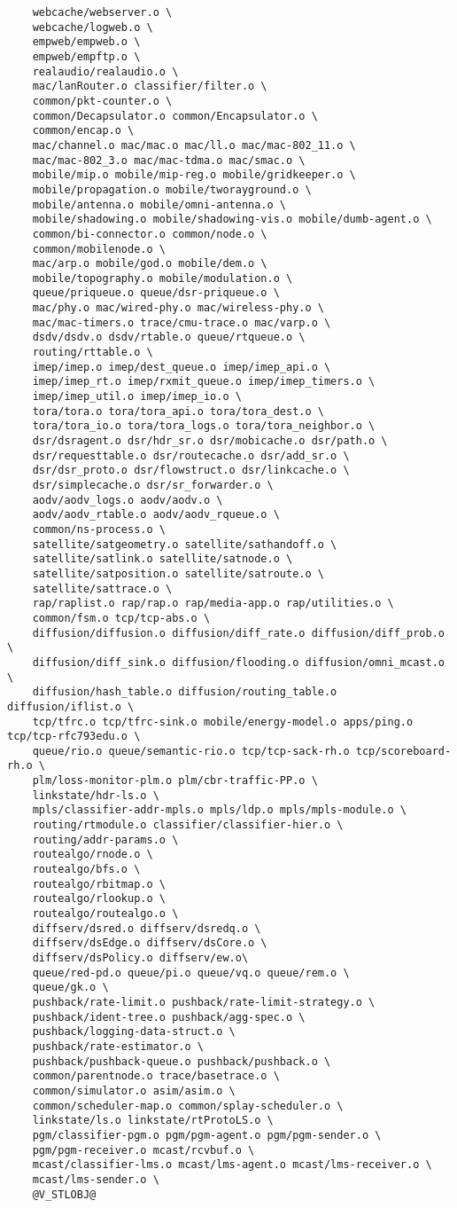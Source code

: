 \begin{verbatim}
	webcache/webserver.o \
	webcache/logweb.o \
	empweb/empweb.o \
	empweb/empftp.o \
	realaudio/realaudio.o \
	mac/lanRouter.o classifier/filter.o \
	common/pkt-counter.o \
	common/Decapsulator.o common/Encapsulator.o \
	common/encap.o \
	mac/channel.o mac/mac.o mac/ll.o mac/mac-802_11.o \
	mac/mac-802_3.o mac/mac-tdma.o mac/smac.o \
	mobile/mip.o mobile/mip-reg.o mobile/gridkeeper.o \
	mobile/propagation.o mobile/tworayground.o \
	mobile/antenna.o mobile/omni-antenna.o \
	mobile/shadowing.o mobile/shadowing-vis.o mobile/dumb-agent.o \
	common/bi-connector.o common/node.o \
	common/mobilenode.o \
	mac/arp.o mobile/god.o mobile/dem.o \
	mobile/topography.o mobile/modulation.o \
	queue/priqueue.o queue/dsr-priqueue.o \
	mac/phy.o mac/wired-phy.o mac/wireless-phy.o \
	mac/mac-timers.o trace/cmu-trace.o mac/varp.o \
	dsdv/dsdv.o dsdv/rtable.o queue/rtqueue.o \
	routing/rttable.o \
	imep/imep.o imep/dest_queue.o imep/imep_api.o \
	imep/imep_rt.o imep/rxmit_queue.o imep/imep_timers.o \
	imep/imep_util.o imep/imep_io.o \
	tora/tora.o tora/tora_api.o tora/tora_dest.o \
	tora/tora_io.o tora/tora_logs.o tora/tora_neighbor.o \
	dsr/dsragent.o dsr/hdr_sr.o dsr/mobicache.o dsr/path.o \
	dsr/requesttable.o dsr/routecache.o dsr/add_sr.o \
	dsr/dsr_proto.o dsr/flowstruct.o dsr/linkcache.o \
	dsr/simplecache.o dsr/sr_forwarder.o \
	aodv/aodv_logs.o aodv/aodv.o \
	aodv/aodv_rtable.o aodv/aodv_rqueue.o \
	common/ns-process.o \
	satellite/satgeometry.o satellite/sathandoff.o \
	satellite/satlink.o satellite/satnode.o \
	satellite/satposition.o satellite/satroute.o \
	satellite/sattrace.o \
	rap/raplist.o rap/rap.o rap/media-app.o rap/utilities.o \
	common/fsm.o tcp/tcp-abs.o \
	diffusion/diffusion.o diffusion/diff_rate.o diffusion/diff_prob.o \
	diffusion/diff_sink.o diffusion/flooding.o diffusion/omni_mcast.o \
	diffusion/hash_table.o diffusion/routing_table.o diffusion/iflist.o \
	tcp/tfrc.o tcp/tfrc-sink.o mobile/energy-model.o apps/ping.o tcp/tcp-rfc793edu.o \
	queue/rio.o queue/semantic-rio.o tcp/tcp-sack-rh.o tcp/scoreboard-rh.o \
	plm/loss-monitor-plm.o plm/cbr-traffic-PP.o \
	linkstate/hdr-ls.o \
	mpls/classifier-addr-mpls.o mpls/ldp.o mpls/mpls-module.o \
	routing/rtmodule.o classifier/classifier-hier.o \
	routing/addr-params.o \
	routealgo/rnode.o \
	routealgo/bfs.o \
	routealgo/rbitmap.o \
	routealgo/rlookup.o \
	routealgo/routealgo.o \
	diffserv/dsred.o diffserv/dsredq.o \
	diffserv/dsEdge.o diffserv/dsCore.o \
	diffserv/dsPolicy.o diffserv/ew.o\
	queue/red-pd.o queue/pi.o queue/vq.o queue/rem.o \
	queue/gk.o \
	pushback/rate-limit.o pushback/rate-limit-strategy.o \
	pushback/ident-tree.o pushback/agg-spec.o \
	pushback/logging-data-struct.o \
	pushback/rate-estimator.o \
	pushback/pushback-queue.o pushback/pushback.o \
	common/parentnode.o trace/basetrace.o \
	common/simulator.o asim/asim.o \
	common/scheduler-map.o common/splay-scheduler.o \
	linkstate/ls.o linkstate/rtProtoLS.o \
	pgm/classifier-pgm.o pgm/pgm-agent.o pgm/pgm-sender.o \
	pgm/pgm-receiver.o mcast/rcvbuf.o \
	mcast/classifier-lms.o mcast/lms-agent.o mcast/lms-receiver.o \
	mcast/lms-sender.o \
	@V_STLOBJ@



\end{verbatim}
